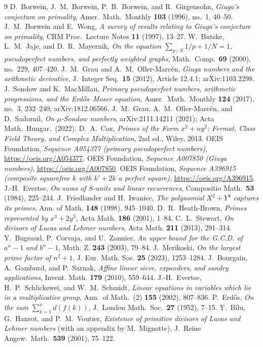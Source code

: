 \documentclass[11pt]{article}
\theoremstyle{definition}
\begin{document}
\begin{thebibliography}{9}
 D.~Borwein, J.~M.~Borwein, P.~B.~Borwein, and R.~Girgensohn, \emph{Giuga's conjecture
on primality}, Amer.\ Math.\ Monthly \textbf{103} (1996), no.~1, 40--50.
 J.~M.~Borwein and E.~Wong, \emph{A survey of results relating to Giuga's
conjecture on primality}, CRM Proc.\ Lecture Notes \textbf{11} (1997), 13--27.
 W.~Butske, L.~M.~Jaje, and D.~R.~Mayernik, \emph{On the equation
$\sum_{p\mid N}1/p+1/N=1$, pseudoperfect numbers, and perfectly weighted graphs}, Math.\ Comp.\
\textbf{69} (2000), no.~229, 407--420.
 J.~M.~Grau and A.~M.~Oller-Marc\'en, \emph{Giuga numbers and the
arithmetic derivative}, J.\ Integer Seq.\ \textbf{15} (2012), Article 12.4.1; arXiv:1103.2298.
\bibitem{SondowMacMillan2017} J.~Sondow and K.~MacMillan, \emph{Primary pseudoperfect numbers,
arithmetic progressions, and the Erd\H{o}s--Moser equation}, Amer.\ Math.\ Monthly \textbf{124} (2017),
no.~3, 232--240; arXiv:1812.06566.
 J.~M.~Grau, A.~M.~Oller-Marc\'en, and D.~Sadornil,
\emph{On $\mu$-Sondow numbers}, arXiv:2111.14211 (2021); Acta Math.\ Hungar.\ (2022).
\bibitem{Cox} D.~A.~Cox, \emph{Primes of the Form $x^2+ny^2$: Fermat, Class Field Theory, and Complex
Multiplication}, 2nd ed., Wiley, 2013.
 OEIS Foundation, \emph{Sequence A054377 (primary pseudoperfect numbers)},
\url{https://oeis.org/A054377}.
 OEIS Foundation, \emph{Sequence A007850 (Giuga numbers)},
\url{https://oeis.org/A007850}.
 OEIS Foundation, \emph{Sequence A396915 (composite squarefree $k$ with
$k'+2k$ a perfect square)}, \url{https://oeis.org/A396915}.
 J.-H.~Evertse, \emph{On sums of $S$-units and linear recurrences}, Compositio
Math.\ \textbf{53} (1984), 225--244.
 J.~Friedlander and H.~Iwaniec, \emph{The polynomial $X^2+Y^4$ captures its
primes}, Ann. of Math. \textbf{148} (1998), 945--1040.
 D.~R.~Heath-Brown, \emph{Primes represented by $x^3+2y^3$}, Acta Math.
\textbf{186} (2001), 1--84.
 C.~L.~Stewart, \emph{On divisors of Lucas and Lehmer numbers}, Acta Math.
\textbf{211} (2013), 291--314.
 Y.~Bugeaud, P.~Corvaja, and U.~Zannier, \emph{An upper bound for the G.C.D. of
$a^n-1$ and $b^n-1$}, Math. Z. \textbf{243} (2003), 79--84.
 J.~Merikoski, \emph{On the largest prime factor of $n^2+1$}, J. Eur. Math.
Soc. \textbf{25} (2023), 1253--1284.
 J.~Bourgain, A.~Gamburd, and P.~Sarnak, \emph{Affine linear sieve, expanders,
and sundry applications}, Invent. Math. \textbf{179} (2010), 559--644.
\bibitem{ESS2002} J.-H.~Evertse, H.~P.~Schlickewei, and W.~M.~Schmidt, \emph{Linear equations in
variables which lie in a multiplicative group}, Ann.\ of Math.\ (2) \textbf{155} (2002), 807--836.
\bibitem{Erdos1952} P.~Erd\H{o}s, \emph{On the sum $\sum_{k=1}^x d(f(k))$}, J.\ London Math.\ Soc.\
\textbf{27} (1952), 7--15.
\bibitem{BHV2001} Y.~Bilu, G.~Hanrot, and P.~M.~Voutier, \emph{Existence of primitive divisors of
Lucas and Lehmer numbers} (with an appendix by M.~Mignotte), J.\ Reine Angew.\ Math.\ \textbf{539}
(2001), 75--122.
\end{thebibliography}
\end{document}
